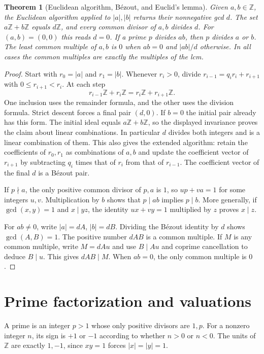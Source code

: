 \documentclass[11pt,oneside,openany]{book}
\theoremstyle{plain}
\newtheorem{theorem}{Theorem}[chapter]
\theoremstyle{definition}
\theoremstyle{remark}
\begin{document}
\begin{theorem}[Euclidean algorithm, B\'ezout, and Euclid's lemma]
\label{nt:A01}
Given $a,b\in\mathbb Z$, the Euclidean algorithm applied to $|a|,|b|$
returns their nonnegative gcd $d$. The set $a\mathbb Z+b\mathbb Z$
equals $d\mathbb Z$, and every common divisor of $a,b$ divides $d$.
For $(a,b)=(0,0)$ this reads $d=0$. If a prime $p$ divides $ab$, then
$p$ divides $a$ or $b$. The least common multiple of $a,b$ is $0$
when $ab=0$ and $|ab|/d$ otherwise. In all cases the common multiples
are exactly the multiples of the lcm.
\end{theorem}
\begin{proof}
Start with $r_0=|a|$ and $r_1=|b|$. Whenever $r_i>0$, divide
$r_{i-1}=q_i r_i+r_{i+1}$ with $0\le r_{i+1}<r_i$. At each
step
\[
 r_{i-1}\mathbb Z+r_i\mathbb Z=r_i\mathbb Z+r_{i+1}\mathbb Z.
\]
One inclusion uses the remainder formula, and the other uses the
division formula. Strict descent forces a final pair $(d,0)$. If
$b=0$ the initial pair already has this form. The initial ideal
equals $a\mathbb Z+b\mathbb Z$, so the displayed invariance proves the
claim about linear combinations. In particular $d$ divides both
integers and is a linear combination of them. This also gives the
extended algorithm: retain the coefficients of $r_0,r_1$ as
combinations of $a,b$ and update the coefficient vector of
$r_{i+1}$ by subtracting $q_i$ times that of $r_i$ from that of
$r_{i-1}$. The coefficient vector of the final $d$ is a B\'ezout
pair.

If $p\nmid a$, the only positive common divisor of $p,a$ is $1$, so
$up+va=1$ for some integers $u,v$. Multiplication by $b$ shows that
$p\mid ab$ implies $p\mid b$. More generally, if $\gcd(x,y)=1$
and $x\mid yz$, the identity $ux+vy=1$ multiplied by $z$ proves
$x\mid z$.

For $ab\ne0$, write $|a|=dA$, $|b|=dB$. Dividing the B\'ezout
identity by $d$ shows $\gcd(A,B)=1$. The positive number $dAB$
is a common multiple. If $M$ is any common multiple, write
$M=dAu$ and use $B\mid Au$ and coprime cancellation to deduce
$B\mid u$. This gives $dAB\mid M$. When $ab=0$, the only
common multiple is $0$.
\end{proof}

\section{Prime factorization and valuations}

A prime is an integer $p>1$ whose only positive divisors are $1,p$.
For a nonzero integer $n$, its sign is $+1$ or $-1$ according to
whether $n>0$ or $n<0$. The units of $\mathbb Z$ are exactly
$1,-1$, since $xy=1$ forces $|x|=|y|=1$.
\end{document}
